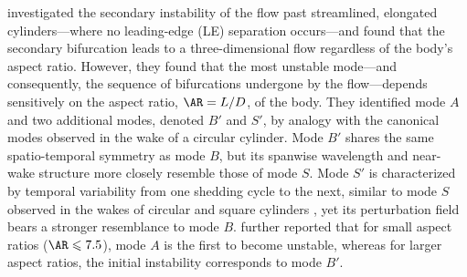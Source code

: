 \cite{ryan-thompson-hourigan-2005} investigated the secondary instability of the flow past streamlined, elongated cylinders---where no leading-edge (LE) separation occurs---and found that the secondary bifurcation leads to a three-dimensional flow regardless of the body’s aspect ratio. However, they found that the most unstable mode---and consequently, the sequence of bifurcations undergone by the flow---depends sensitively on the aspect ratio, $\AR = L/D$, of the body. They identified mode $A$ and two additional modes, denoted $B'$ and $S'$, by analogy with the canonical modes observed in the wake of a circular cylinder. Mode $B'$ shares the same spatio-temporal symmetry as mode $B$, but its spanwise wavelength and near-wake structure more closely resemble those of mode $S$. Mode $S'$ is characterized by temporal variability from one shedding cycle to the next, similar to mode $S$ observed in the wakes of circular and square cylinders \citep{robichaux-balachandar-vanka-1999}, yet its perturbation field bears a stronger resemblance to mode $B$. \citet{ryan-thompson-hourigan-2005} further reported that for small aspect ratios ($\AR \leq 7.5$), mode $A$ is the first to become unstable, whereas for larger aspect ratios, the initial instability corresponds to mode $B'$.

